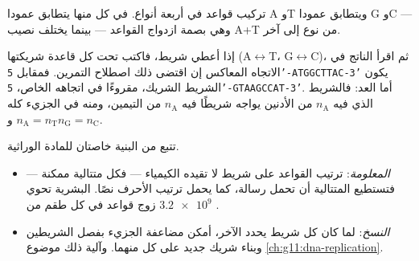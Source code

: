 \begin{omfigure}

{\small تركيب قواعد  في أربعة أنواع. في كل منها يتطابق عمودا A وT
ويتطابق عمودا G وC --- وهي بصمة ازدواج القواعد --- بينما يختلف نصيب
A+T من نوع إلى آخر.}
\end{omfigure}

\begin{method}\label{met:g10:universal-dna:complement}
إذا أعطي شريط، فاكتب تحت كل قاعدة شريكتها (A$\leftrightarrow$T،
G$\leftrightarrow$C)، ثم اقرأ الناتج في الاتجاه المعاكس إن اقتضى ذلك
اصطلاح التمرين. فمقابل \texttt{5'-ATGGCTTAC-3'} يكون الشريط الشريك،
مقروءًا في اتجاهه الخاص، \texttt{5'-GTAAGCCAT-3'}. أما العد: فالشريط
الذي فيه $n_\mathrm{A}$ من الأدنين يواجه شريطًا فيه $n_\mathrm{A}$ من
التيمين، ومنه في الجزيء كله $n_\mathrm{A} = n_\mathrm{T}$
و$n_\mathrm{G} = n_\mathrm{C}$.
\end{method}

\begin{proposition}\label{prop:g10:universal-dna:explains}
تتبع من البنية خاصتان للمادة الوراثية.
\begin{itemize}
  \item \emph{المعلومة}: ترتيب القواعد على شريط لا تقيده الكيمياء ---
        فكل متتالية ممكنة --- فتستطيع المتتالية أن تحمل رسالة، كما
        يحمل ترتيب الأحرف نصًا.  البشرية تحوي $\num{3.2e9}$
        زوج قواعد في كل طقم من .
  \item \emph{النسخ}: لما كان كل شريط يحدد الآخر، أمكن مضاعفة الجزيء
        بفصل الشريطين وبناء شريك جديد على كل منهما. وآلية ذلك موضوع
        \cref{ch:g11:dna-replication}.
\end{itemize}
\end{proposition}
\admitted

